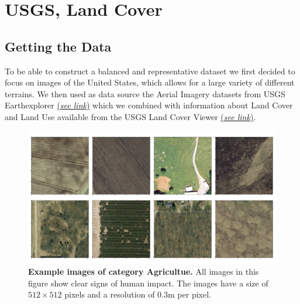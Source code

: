 \section{USGS, Land Cover}

\subsection{Getting the Data}
To be able to construct a balanced and representative dataset we first decided to focus on images of the United States, which allows for a large variety of different terrains. We then used as data source the Aerial Imagery datasets from USGS Earthexplorer \href{https://earthexplorer.usgs.gov/}{(\textit{see link})} which we combined with information about Land Cover and Land Use available from the USGS Land Cover Viewer \href{https://gis1.usgs.gov/csas/gap/viewer/land_cover/Map.aspx}{(\textit{see link})}.

\begin{figure}[h!]
	\centering
	\captionsetup{width=1\linewidth}
	\includegraphics[width=1\textwidth]{Figures/agriculture_sample.pdf}
	\caption{\textbf{Example images of category Agricultue.} All images in this figure show clear signs of human impact. The images have a size of $512\times512$ pixels and a resolution of $0.3$m per pixel.}
	\label{fig:agriculture_sample}
\end{figure}


